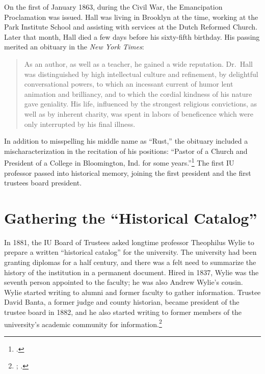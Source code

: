 \documentclass[
  american,
  letterpaper,
]{scrreprt}
\begin{document}
On the first of January 1863, during the Civil War, the Emancipation
Proclamation was issued. Hall was living in Brooklyn at the time,
working at the Park Institute School and assisting with services at the
Dutch Reformed Church. Later that month, Hall died a few days before his
sixty-fifth birthday. His passing merited an obituary in the \emph{New
York Times}:

\begin{quote}
As an author, as well as a teacher, he gained a wide reputation.
Dr.~Hall was distinguished by high intellectual culture and refinement,
by delightful conversational powers, to which an incessant current of
humor lent animation and brilliancy, and to which the cordial kindness
of his nature gave geniality. His life, influenced by the strongest
religious convictions, as well as by inherent charity, was spent in
labors of beneficence which were only interrupted by his final illness.
\end{quote}

In addition to misspelling his middle name as ``Rust,'' the obituary
included a mischaracterization in the recitation of his positions:
``Pastor of a Church and President of a College in Bloomington, Ind. for
some years.''\footnote{.}
The first IU professor passed into historical memory, joining the first
president and the first trustees board president.

\section{Gathering the ``Historical
Catalog''}\label{gathering-the-historical-catalog}

In 1881, the IU Board of Trustees asked longtime professor Theophilus
Wylie to prepare a written ``historical catalog'' for the university.
The university had been granting diplomas for a half century, and there
was a felt need to summarize the history of the institution in a
permanent document. Hired in 1837, Wylie was the seventh person
appointed to the faculty; he was also Andrew Wylie's cousin. Wylie
started writing to alumni and former faculty to gather information.
Trustee David Banta, a former judge and county historian, became
president of the trustee board in 1882, and he also started writing to
former members of the university's academic community for
information.\footnote{; .}
\end{document}
